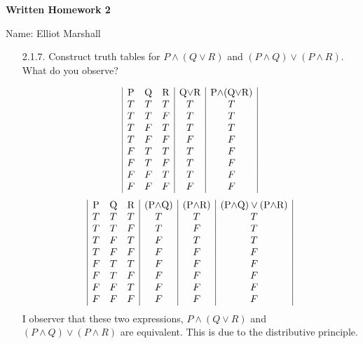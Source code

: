 \documentclass[12pt]{article}
\begin{document}
\centerline{\bf Written Homework 2}

\centerline{Name: Elliot Marshall}



\begin{itemize}
\item[2.1.7.] Construct truth tables for $P\wedge (Q\vee R)$ and $(P\wedge Q)\vee (P\wedge R)$. What do you observe?

\begin{displaymath}
    \begin{array}{|c c c|c|c|}
        $P$ & $Q$ & $R$ & $Q$\vee $R$ & $P$\wedge ($Q$\vee $R$)\\
        T & T & T & T & T \\
        T & T & F & T & T \\
        T & F & T & T & T \\
        T & F & F & F & F \\
        F & T & T & T & F \\
        F & T & F & T & F \\
        F & F & T & T & F \\
        F & F & F & F & F \\
        
    \end{array}
\end{displaymath}
\begin{displaymath}
    \begin{array}{|c c c|c|c|c|}
        $P$ & $Q$ & $R$ & ($P$\wedge$Q$) & ($P$\wedge$R$) & ($P$\wedge$Q$)\vee($P$\wedge$R$) \\
        T & T & T & T & T & T \\
        T & T & F & T & F & T \\
        T & F & T & F & T & T \\
        T & F & F & F & F & F \\
        F & T & T & F & F & F \\
        F & T & F & F & F & F \\
        F & F & T & F & F & F \\
        F & F & F & F & F & F \\
    \end{array}
\end{displaymath}
I observer that these two expressions, $P\wedge (Q\vee R)$ and $(P\wedge Q)\vee (P\wedge R)$ are equivalent.
This is due to the distributive principle.


\hrulefill


\end{itemize}
\end{document}
